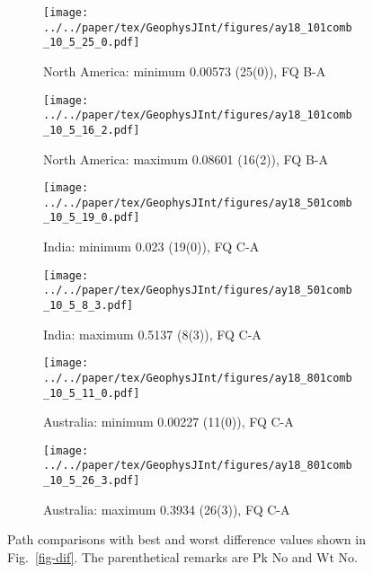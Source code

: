 \begin{figure}
	\centering
	\begin{subfigure}{.42\textwidth} %
		\texttt{[image: ../../paper/tex/GeophysJInt/figures/ay18\_101comb\_10\_5\_25\_0.pdf]}
		\caption{North America: minimum 0.00573 (25(0)), FQ
		B-A}\label{fig-nac-105250}
	\end{subfigure}
	\begin{subfigure}{.42\textwidth} %
		\texttt{[image: ../../paper/tex/GeophysJInt/figures/ay18\_101comb\_10\_5\_16\_2.pdf]}
		\caption{North America: maximum 0.08601 (16(2)), FQ
		B-A}\label{fig-nac-105162}
	\end{subfigure}
	\vspace{.1em}
	\begin{subfigure}{.42\textwidth}
		\texttt{[image: ../../paper/tex/GeophysJInt/figures/ay18\_501comb\_10\_5\_19\_0.pdf]}
		\caption{India: minimum 0.023 (19(0)), FQ C-A}\label{fig-ind-105190}
	\end{subfigure}
	\begin{subfigure}{.42\textwidth}
		\texttt{[image: ../../paper/tex/GeophysJInt/figures/ay18\_501comb\_10\_5\_8\_3.pdf]}
		\caption{India: maximum 0.5137 (8(3)), FQ C-A}\label{fig-ind-10583}
	\end{subfigure}
	\vspace{.1em}
	\begin{subfigure}{.42\textwidth}
		\texttt{[image: ../../paper/tex/GeophysJInt/figures/ay18\_801comb\_10\_5\_11\_0.pdf]}
		\caption{Australia: minimum 0.00227 (11(0)), FQ C-A}\label{fig-au-105110}
	\end{subfigure}
	\begin{subfigure}{.42\textwidth}
		\texttt{[image: ../../paper/tex/GeophysJInt/figures/ay18\_801comb\_10\_5\_26\_3.pdf]}
		\caption{Australia: maximum 0.3934 (26(3)), FQ C-A}\label{fig-au-105263}
	\end{subfigure}
	\caption[Best and worst $\mathcal{CPD}$s (10/5 Myr window/step)]{Path
comparisons with best and worst difference values shown in Fig.~\ref{fig-dif}.
The parenthetical remarks are Pk No and Wt No.}\label{fig-difbw}
\end{figure}

